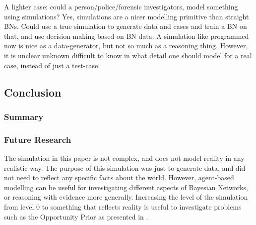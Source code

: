 \documentclass[11pt]{article}
\begin{document}
A lighter case: could a person/police/forensic investigators, model something using simulations?
Yes, simulations are a nicer modelling primitive than straight BNs. Could use a true simulation to generate data and cases and train a BN on that, and use decision making based on BN data. A simulation like programmed now is nice as a data-generator, but not so much as a reasoning thing. However, it is unclear unknown difficult to know in what detail one should model for a real case, instead of just a test-case.

\subsection{Conclusion}

\subsubsection{Summary}
 
\subsubsection{Future Research}

The simulation in this paper is not complex, and does not model reality in any realistic way. The purpose of this simulation was just to generate data, and did not need to reflect any specific facts about the world. However, agent-based modelling can be useful for investigating different aspects of Bayesian Networks, or reasoning with evidence more generally. Increasing the level of the simulation from level 0 to something that reflects reality is useful to investigate problems such as the Opportunity Prior as presented in \citet{Fenton2017}. 




\end{document}
